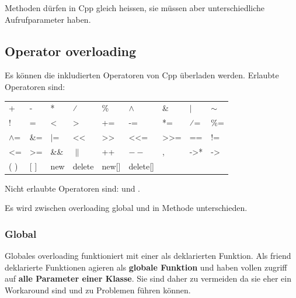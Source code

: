 Methoden dürfen in Cpp gleich heissen, sie müssen aber unterschiedliche Aufrufparameter haben.



\subsection{Operator overloading}

Es können die inkludierten Operatoren von Cpp überladen werden. 
Erlaubte Operatoren sind:\\
\begin{tabular}{lllllllll}
    +            & -               & *           & ⁄                      & \%                           & $\wedge$                & \&                            & $|$              & $\sim$          \\
    !            & =               & \textless{} & \textgreater{}         & +=                           & -=                      & *=                            & ⁄=               & \%=             \\
    $\wedge$=    & \&=             & $|$=        & \textless{}\textless{} & \textgreater{}\textgreater{} & \textless{}\textless{}= & \textgreater{}\textgreater{}= & ==               & !=              \\
    \textless{}= & \textgreater{}= & \&\&        & $\|$                   & ++                           & $--$                    & ,                             & -\textgreater{}* & -\textgreater{} \\
    ( )          & {[} {]}         & new         & delete                 & new{[}{]}                    & delete{[}{]}            &                               &                  &                
\end{tabular}

Nicht erlaubte Operatoren sind:   \say{::} und .

Es wird zwischen overloading global und in Methode unterschieden.

\subsubsection{Global}

Globales overloading funktioniert mit einer als  deklarierten Funktion. 
Als friend deklarierte Funktionen agieren als \textbf{globale Funktion} und haben vollen zugriff auf \textbf{alle Parameter einer Klasse}. 
Sie sind daher zu vermeiden da sie eher ein Workaround sind und zu Problemen führen können.\\ 

